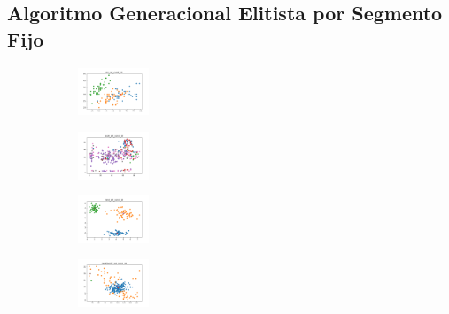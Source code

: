 \vspace*{\fill}
\newpage


\subsection{Algoritmo Generacional Elitista por Segmento Fijo}

\begin{figure}[H]    
    \centering
    \begin{subfigure}
        \centering
        \includegraphics[width=0.234\textwidth]{img/aggsf/iris_set_const_10_949004259_clust.png}
    \end{subfigure}
    \hfill
    \begin{subfigure}
        \centering
        \includegraphics[width=0.234\textwidth]{img/aggsf/ecoli_set_const_10_949004259_clust.png}
    \end{subfigure}
    \hfill
    \begin{subfigure}
        \centering
        \includegraphics[width=0.234\textwidth]{img/aggsf/rand_set_const_10_949004259_clust.png}
    \end{subfigure}
    \hfill
    \begin{subfigure}
        \centering
        \includegraphics[width=0.234\textwidth]{img/aggsf/newthyroid_set_const_10_949004259_clust.png}

\end{subfigure}
\end{figure}
